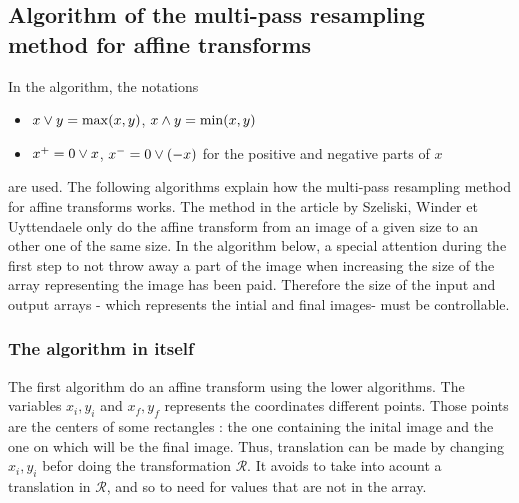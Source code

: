 \subsection{Algorithm of the multi-pass resampling method for affine transforms}


 In the algorithm, the notations
 \begin{itemize}
 \item $x \vee y = \max(x,y)$, $x \wedge y = \min(x,y)$
 \item $x^+ = 0 \vee x$, $x^- = 0 \vee (-x)$ for the positive and negative parts of $x$
 \end{itemize}
 are used.
 	The following algorithms explain how the multi-pass resampling method for affine transforms works. The method in the article by Szeliski, Winder et Uyttendaele \cite{szeliski2010high} only do the affine transform from an image of a given size to an other one of the same size. In the algorithm below, a special attention during the first step to not throw away a part of the image when increasing the size of the array representing the image has been paid. Therefore the size of the input and output arrays - which represents the intial and final images- must be controllable.
 
 
 
  

\subsubsection{The algorithm in itself}
 The first algorithm do an affine transform using the lower algorithms. The variables $x_i,y_i$ and $x_f,y_f$ represents the coordinates different points. Those points are the centers of some rectangles : the one containing the inital image and the one on which will be the final image. Thus, translation can be made by changing  $x_i,y_i$ befor doing the transformation $\mathcal R$. It avoids to take into acount a translation in $\mathcal R$, and so to need for values that are not in the array.
 
